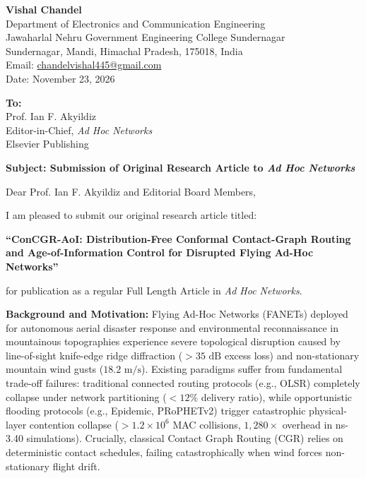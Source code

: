 \documentclass[11pt,a4paper]{article}
\begin{document}
\noindent
\textbf{Vishal Chandel}\\
Department of Electronics and Communication Engineering\\
Jawaharlal Nehru Government Engineering College Sundernagar\\
Sundernagar, Mandi, Himachal Pradesh, 175018, India\\
Email: \href{mailto:chandelvishal445@gmail.com}{chandelvishal445@gmail.com}\\
Date: November 23, 2026

\vspace{1.5em}

\noindent
\textbf{To:}\\
Prof. Ian F. Akyildiz\\
Editor-in-Chief, \textit{Ad Hoc Networks}\\
Elsevier Publishing

\vspace{1.5em}

\noindent
\textbf{Subject: Submission of Original Research Article to \textit{Ad Hoc Networks}}

\vspace{1em}

\noindent
Dear Prof. Ian F. Akyildiz and Editorial Board Members,

\vspace{0.8em}
I am pleased to submit our original research article titled:

\begin{center}
\textbf{``ConCGR-AoI: Distribution-Free Conformal Contact-Graph Routing and Age-of-Information Control for Disrupted Flying Ad-Hoc Networks''}
\end{center}

\noindent
for publication as a regular Full Length Article in \textit{Ad Hoc Networks}.

\vspace{0.8em}
\noindent
\textbf{Background and Motivation:}
Flying Ad-Hoc Networks (FANETs) deployed for autonomous aerial disaster response and environmental reconnaissance in mountainous topographies experience severe topological disruption caused by line-of-sight knife-edge ridge diffraction ($> 35\text{ dB}$ excess loss) and non-stationary mountain wind gusts ($18.2\text{ m/s}$). Existing paradigms suffer from fundamental trade-off failures: traditional connected routing protocols (e.g., OLSR) completely collapse under network partitioning ($< 12\%$ delivery ratio), while opportunistic flooding protocols (e.g., Epidemic, PRoPHETv2) trigger catastrophic physical-layer contention collapse ($> 1.2\times 10^6$ MAC collisions, $1,280\times$ overhead in ns-3.40 simulations). Crucially, classical Contact Graph Routing (CGR) relies on deterministic contact schedules, failing catastrophically when wind forces non-stationary flight drift.
\end{document}
